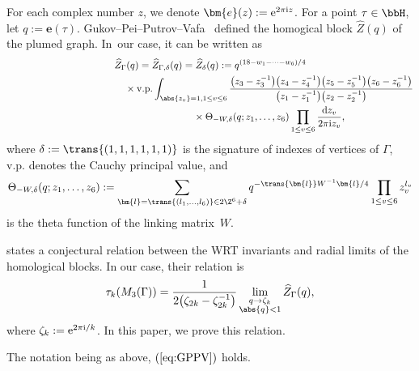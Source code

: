 For each complex number $ z $, we denote $ \bm{e}(z) := {\rm e}^{2\pi {\rm i} z} $.
For a point $ \tau \in \bbH $, let $ q := \bm{e}(\tau) $.
Gukov--Pei--Putrov--Vafa~\cite[formula~(3.145)]{GPPV} defined the homogical block $ \widehat{Z}(q) $ of the plumed graph.
In~our case, it can be written as
\begin{gather}
\widehat{Z}_\Gamma (q)		= \widehat{Z}_{\Gamma, \delta} (q)
= \widehat{Z}_\delta (q):=
q^{(18 - w_1 - \cdots - w_6)/4} \nonumber
\\
\hphantom{\widehat{Z}_\Gamma (q)= \widehat{Z}_{\Gamma, \delta} (q) = \widehat{Z}_\delta (q):=}
{}\times \mathrm{v.p.}\int_{\abs{z_v} = 1, 1 \le v \le 6}
\frac{\big(z_3 - z_3^{-1}\big)\big(z_4 - z_4^{-1}\big)\big(z_5 - z_5^{-1}\big)\big(z_6 - z_6^{-1}\big)}{\big(z_1 - z_1^{-1}\big)\big(z_2 - z_2^{-1}\big)}\nonumber\\
\hphantom{\widehat{Z}_\Gamma (q)= \widehat{Z}_{\Gamma, \delta} (q) = \widehat{Z}_\delta (q):=}
{}\times
\Theta_{-W, \delta} (q; z_1, \dots, z_6)
 \prod_{1 \le v \le 6} \frac{{\rm d}z_v}{2\pi {\rm i} z_v},
\label{eq:homological_block_for_H}
\end{gather}
where $ \delta := \trans{(1, 1, 1, 1, 1, 1)} $ is the signature of indexes of vertices of $ \Gamma $, $ \mathrm{v.p.} $ denotes the Cauchy principal value, and
\begin{gather*}
\Theta_{-W, \delta} (q; z_1, \dots, z_6) :=
\sum_{\bm{l} = \trans{(l_1, \dots, l_6)} \in 2\Z^6 + \delta} q^{-\trans{\bm{l}} W^{-1} \bm{l}/4} \prod_{1 \le v \le 6} z_v^{l_v}
\end{gather*}
is the theta function of the linking matrix~$ W $.

\cite[Conjecture 2.1 and relation~(A.28)]{GPPV} states a conjectural relation between the WRT invariants and radial limits of the homological blocks.
In our case, their relation is
\begin{equation} \label{eq:GPPV}
	\tau_k(M_3(\Gamma)) = \frac{1}{2\big(\zeta_{2k} - \zeta_{2k}^{-1}\big)}
	\lim_{\substack{q \to \zeta_k \\
			\abs{q} < 1	}
	} \widehat{Z}_\Gamma (q),
\end{equation}
where $ \zeta_k := {\rm e}^{2\pi {\rm i}/k} $.
In this paper, we prove this relation.

\begin{Theorem} \label{thm:WRT_homological_block_main}
	The notation being as above, $(\ref{eq:GPPV})$ holds.
\end{Theorem}


